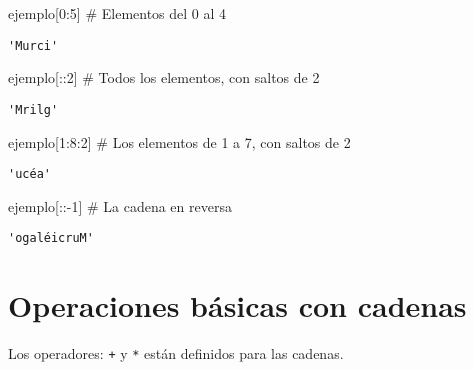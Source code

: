 \documentclass[
  letterpaper,
  DIV=11,
  numbers=noendperiod]{scrreprt}
\newenvironment{Shaded}{\begin{snugshade}}{\end{snugshade}}
\newcommand{\CommentTok}[1]{\textcolor[rgb]{0.37,0.37,0.37}{#1}}
\newcommand{\DecValTok}[1]{\textcolor[rgb]{0.68,0.00,0.00}{#1}}
\newcommand{\NormalTok}[1]{\textcolor[rgb]{0.00,0.23,0.31}{#1}}
\newcommand{\OperatorTok}[1]{\textcolor[rgb]{0.37,0.37,0.37}{#1}}
\begin{document}
\begin{Shaded}
\begin{Highlighting}[]
\NormalTok{ejemplo[}\DecValTok{0}\NormalTok{:}\DecValTok{5}\NormalTok{] }\CommentTok{\# Elementos del 0 al 4 }
\end{Highlighting}
\end{Shaded}

\begin{verbatim}
'Murci'
\end{verbatim}

\begin{Shaded}
\begin{Highlighting}[]
\NormalTok{ejemplo[::}\DecValTok{2}\NormalTok{] }\CommentTok{\# Todos los elementos, con saltos de 2}
\end{Highlighting}
\end{Shaded}

\begin{verbatim}
'Mrilg'
\end{verbatim}

\begin{Shaded}
\begin{Highlighting}[]
\NormalTok{ejemplo[}\DecValTok{1}\NormalTok{:}\DecValTok{8}\NormalTok{:}\DecValTok{2}\NormalTok{] }\CommentTok{\# Los elementos de 1 a 7, con saltos de 2}
\end{Highlighting}
\end{Shaded}

\begin{verbatim}
'ucéa'
\end{verbatim}

\begin{Shaded}
\begin{Highlighting}[]
\NormalTok{ejemplo[::}\OperatorTok{{-}}\DecValTok{1}\NormalTok{] }\CommentTok{\# La cadena en reversa}
\end{Highlighting}
\end{Shaded}

\begin{verbatim}
'ogaléicruM'
\end{verbatim}

\section{Operaciones básicas con
cadenas}\label{operaciones-buxe1sicas-con-cadenas}

Los operadores: \texttt{+} y \texttt{*} están definidos para las
cadenas.
\end{document}
